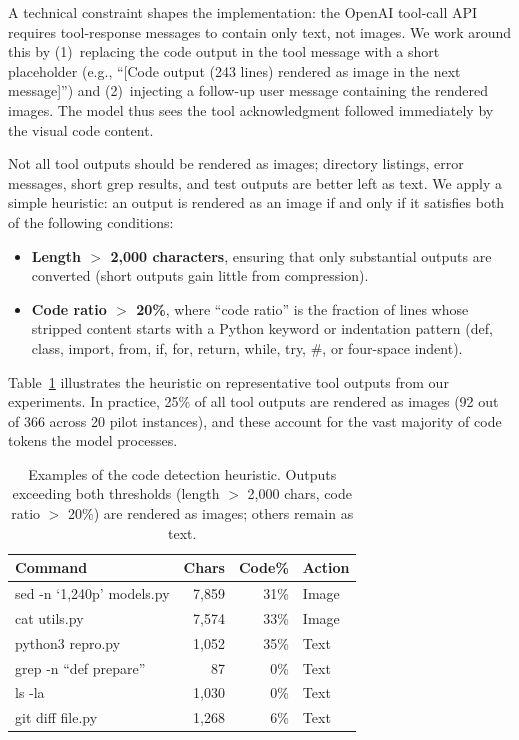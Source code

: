 A technical constraint shapes the implementation: the OpenAI tool-call API requires tool-response messages to contain only text, not images. We work around this by (1)~replacing the code output in the tool message with a short placeholder (e.g., ``[Code output (243 lines) rendered as image in the next message]'') and (2)~injecting a follow-up user message containing the rendered images. The model thus sees the tool acknowledgment followed immediately by the visual code content.

Not all tool outputs should be rendered as images; directory listings, error messages, short grep results, and test outputs are better left as text. We apply a simple heuristic: an output is rendered as an image if and only if it satisfies both of the following conditions:
\begin{itemize}[leftmargin=*]
  \item \textbf{Length $>$ 2{,}000 characters}, ensuring that only substantial outputs are converted (short outputs gain little from compression).
  \item \textbf{Code ratio $>$ 20\%}, where ``code ratio'' is the fraction of lines whose stripped content starts with a Python keyword or indentation pattern (def, class, import, from, if, for, return, while, try, \#, or four-space indent).
\end{itemize}

Table~\ref{tab:code-detection-examples} illustrates the heuristic on representative tool outputs from our experiments. In practice, 25\% of all tool outputs are rendered as images (92 out of 366 across 20 pilot instances), and these account for the vast majority of code tokens the model processes.

\begin{table}[t]
\centering
\caption{Examples of the code detection heuristic. Outputs exceeding both thresholds (length $>$ 2{,}000 chars, code ratio $>$ 20\%) are rendered as images; others remain as text.}
\label{tab:code-detection-examples}
\small
\begin{tabular}{p{3.8cm}rrl}
\toprule
\textbf{Command} & \textbf{Chars} & \textbf{Code\%} & \textbf{Action} \\
\midrule
sed -n `1,240p' models.py & 7{,}859 & 31\% & Image \\
cat utils.py & 7{,}574 & 33\% & Image \\
python3 repro.py & 1{,}052 & 35\% & Text \\
grep -n ``def prepare'' & 87 & 0\% & Text \\
ls -la & 1{,}030 & 0\% & Text \\
git diff file.py & 1{,}268 & 6\% & Text \\
\bottomrule
\end{tabular}
\end{table}

